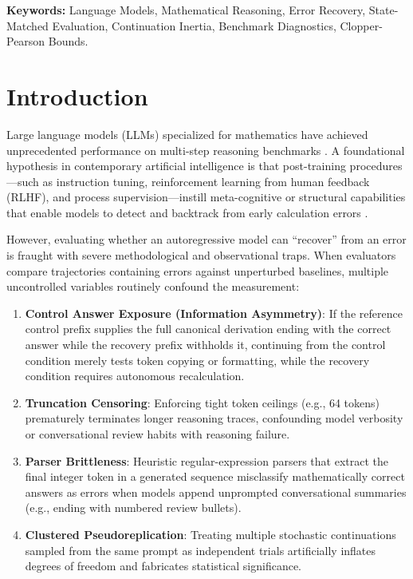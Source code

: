 \documentclass[11pt,letterpaper]{article}
\begin{document}
\vspace{0.5em}
\noindent\textbf{Keywords:} Language Models, Mathematical Reasoning, Error Recovery, State-Matched Evaluation, Continuation Inertia, Benchmark Diagnostics, Clopper-Pearson Bounds.

\newpage

\section{Introduction}

Large language models (LLMs) specialized for mathematics have achieved unprecedented performance on multi-step reasoning benchmarks \cite{cobbe2021gsm8k, qwen25math2024}. A foundational hypothesis in contemporary artificial intelligence is that post-training procedures---such as instruction tuning, reinforcement learning from human feedback (RLHF), and process supervision---instill meta-cognitive or structural capabilities that enable models to detect and backtrack from early calculation errors \cite{lightman2023process, zelikman2022star, snell2024scaling}.

However, evaluating whether an autoregressive model can ``recover'' from an error is fraught with severe methodological and observational traps. When evaluators compare trajectories containing errors against unperturbed baselines, multiple uncontrolled variables routinely confound the measurement:
\begin{enumerate}[leftmargin=*]
    \item \textbf{Control Answer Exposure (Information Asymmetry)}: If the reference control prefix supplies the full canonical derivation ending with the correct answer while the recovery prefix withholds it, continuing from the control condition merely tests token copying or formatting, while the recovery condition requires autonomous recalculation.
    \item \textbf{Truncation Censoring}: Enforcing tight token ceilings (e.g., 64 tokens) prematurely terminates longer reasoning traces, confounding model verbosity or conversational review habits with reasoning failure.
    \item \textbf{Parser Brittleness}: Heuristic regular-expression parsers that extract the final integer token in a generated sequence misclassify mathematically correct answers as errors when models append unprompted conversational summaries (e.g., ending with numbered review bullets).
    \item \textbf{Clustered Pseudoreplication}: Treating multiple stochastic continuations sampled from the same prompt as independent trials artificially inflates degrees of freedom and fabricates statistical significance.
\end{enumerate}
\end{document}
